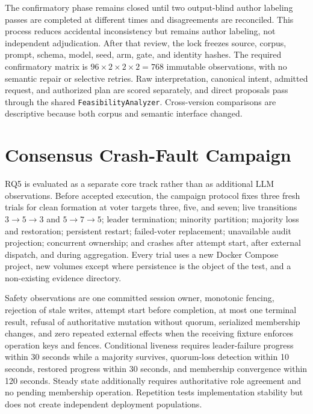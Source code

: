 The confirmatory phase remains closed until two output-blind author labeling passes are completed at different times and disagreements are reconciled. This process reduces accidental inconsistency but remains author labeling, not independent adjudication. After that review, the lock freezes source, corpus, prompt, schema, model, seed, arm, gate, and identity hashes. The required confirmatory matrix is $96\times2\times2\times2=768$ immutable observations, with no semantic repair or selective retries. Raw interpretation, canonical intent, admitted request, and authorized plan are scored separately, and direct proposals pass through the shared \texttt{FeasibilityAnalyzer}. Cross-version comparisons are descriptive because both corpus and semantic interface changed.

\section{Consensus Crash-Fault Campaign}

RQ5 is evaluated as a separate core track rather than as additional LLM observations. Before accepted execution, the campaign protocol fixes three fresh trials for clean formation at voter targets three, five, and seven; live transitions $3\rightarrow5\rightarrow3$ and $5\rightarrow7\rightarrow5$; leader termination; minority partition; majority loss and restoration; persistent restart; failed-voter replacement; unavailable audit projection; concurrent ownership; and crashes after attempt start, after external dispatch, and during aggregation. Every trial uses a new Docker Compose project, new volumes except where persistence is the object of the test, and a non-existing evidence directory.

Safety observations are one committed session owner, monotonic fencing, rejection of stale writes, attempt start before completion, at most one terminal result, refusal of authoritative mutation without quorum, serialized membership changes, and zero repeated external effects when the receiving fixture enforces operation keys and fences. Conditional liveness requires leader-failure progress within 30 seconds while a majority survives, quorum-loss detection within 10 seconds, restored progress within 30 seconds, and membership convergence within 120 seconds. Steady state additionally requires authoritative role agreement and no pending membership operation. Repetition tests implementation stability but does not create independent deployment populations.

